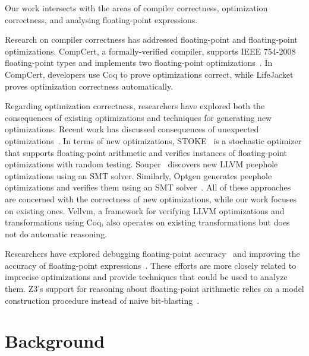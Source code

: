 \documentclass[preprint, numbers]{sigplanconf}
\newcommand{\xxx}{LifeJacket}
\begin{document}
Our work intersects with the areas of compiler correctness, optimization
correctness, and analysing floating-point expressions.



Research on compiler correctness has addressed floating-point and
floating-point optimizations. CompCert, a formally-verified compiler, supports
IEEE 754-2008 floating-point types and implements two floating-point
optimizations~\cite{boldo2015verified}. In CompCert, developers use Coq to
prove optimizations correct, while \xxx{} proves optimization correctness
automatically.

Regarding optimization correctness, researchers have explored both the
consequences of existing optimizations and techniques for generating new
optimizations. Recent work has discussed consequences of unexpected
optimizations~\cite{wang2013towards}. In terms of new optimizations,
STOKE~\cite{schkufza2014stochastic} is a stochastic optimizer that supports
floating-point arithmetic and verifies instances of floating-point
optimizations with random testing. Souper~\cite{souper} discovers new LLVM
peephole optimizations using an SMT solver. Similarly, Optgen generates
peephole optimizations and verifies them using an SMT
solver~\cite{buchwald2015optgen}. All of these approaches are concerned with
the correctness of new optimizations, while our work focuses on existing ones.
Vellvm, a framework for verifying LLVM optimizations and transformations using
Coq, also operates on existing transformations but does not do automatic
reasoning.

Researchers have explored debugging floating-point
accuracy~\cite{chiang2014efficient} and improving the accuracy of
floating-point expressions~\cite{panchekha2015automatically}. These efforts are
more closely related to imprecise optimizations and provide techniques that
could be used to analyze them. Z3's support for reasoning about floating-point
arithmetic relies on a model construction procedure instead of naive
bit-blasting~\cite{zeljic2014approximations}.





\section{Background}
\end{document}
